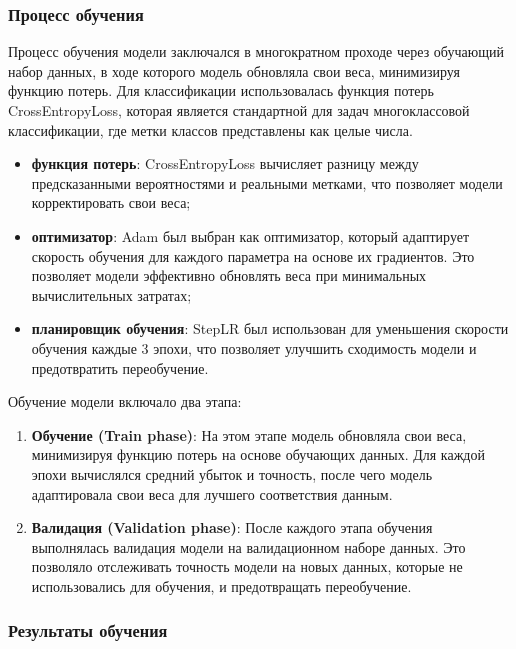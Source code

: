 {    \subsubsection*{Процесс обучения}

    Процесс обучения модели заключался в многократном проходе через обучающий набор данных, в ходе которого модель обновляла свои веса, минимизируя функцию потерь. Для классификации использовалась функция потерь CrossEntropyLoss, которая является стандартной для задач многоклассовой классификации, где метки классов представлены как целые числа.

    \begin{itemize}
        \item \textbf{функция потерь}: CrossEntropyLoss вычисляет разницу между предсказанными вероятностями и реальными метками, что позволяет модели корректировать свои веса;
        \item \textbf{оптимизатор}: Adam был выбран как оптимизатор, который адаптирует скорость обучения для каждого параметра на основе их градиентов. Это позволяет модели эффективно обновлять веса при минимальных вычислительных затратах;
        \item \textbf{планировщик обучения}: StepLR был использован для уменьшения скорости обучения каждые 3 эпохи, что позволяет улучшить сходимость модели и предотвратить переобучение.
    \end{itemize}

    Обучение модели включало два этапа:

    \begin{enumerate}
        \item \textbf{Обучение (Train phase)}: На этом этапе модель обновляла свои веса, минимизируя функцию потерь на основе обучающих данных. Для каждой эпохи вычислялся средний убыток и точность, после чего модель адаптировала свои веса для лучшего соответствия данным.
        \item \textbf{Валидация (Validation phase)}: После каждого этапа обучения выполнялась валидация модели на валидационном наборе данных. Это позволяло отслеживать точность модели на новых данных, которые не использовались для обучения, и предотвращать переобучение.
    \end{enumerate}

    \subsubsection*{Результаты обучения}

}
